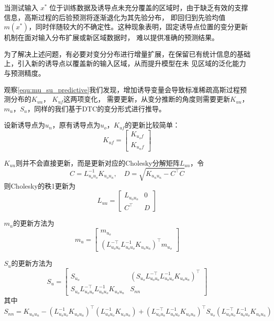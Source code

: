 当测试输入 $x^*$ 位于训练数据及诱导点未充分覆盖的区域时，由于缺乏有效的支撑信息，高斯过程的后验预测将逐渐退化为其先验分布，
即回归到先验均值 $m(x^*)$，同时伴随较大的不确定性。这种现象表明，固定诱导点位置的变分更新机制在面对输入分布扩展或新区域数据时，
难以提供准确的预测结果。

为了解决上述问题，有必要对变分分布进行增量扩展，在保留已有统计信息的基础上，引入新的诱导点以覆盖新的输入区域，从而提升模型在未
见区域的泛化能力与预测精度。

观察\autoref{equ:mu_su_predictive}我们发现，增加诱导变量会导致标准稀疏高斯过程预测分布的$K_{u u}$， $K_{u f}$这两项变化，
需要更新，从变分推断的角度则需要更新$K_{u u}$，$m_u$，$S_u$，同样的我们基于DTC的变分形式进行推导。

设新诱导点为$u_{n}$，原有诱导点为$u_{o}$，$K_{u f}$的更新比较简单：
\begin{equation}
    K_{u f} = \begin{bmatrix}
        K_{u_o f} \\
        K_{u_n f}
    \end{bmatrix}
\end{equation}

$K_{u u}$则并不会直接更新，而是更新对应的Cholesky分解矩阵$L_{u u}$，令
\begin{equation}
    C = L_{u_o u_o}^{-1} K_{u_o u_n}, \quad D = \sqrt{K_{u_n u_n} - C^\top C}
\end{equation}
则Cholesky的秩1更新为
\begin{equation}
    L_{u u} = \begin{bmatrix}
        L_{u_o u_o} & 0 \\
        C^\top & D
    \end{bmatrix}
\end{equation}

$m_u$的更新方法为
\begin{equation}
    m_u = \begin{bmatrix}
        m_{u_o} \\
        (L_{u_o u_o}^{-\top} L_{u_o u_o}^{-1} K_{u_o u_n})^\top m_{u_o}
    \end{bmatrix}
\end{equation}

$S_u$的更新方法为
\begin{equation}
    S_u = \begin{bmatrix}
        S_{u_o} & (S_{u_o} L_{u_o u_o}^{-\top} L_{u_o u_o}^{-1} K_{u_o u_n})^\top \\
        S_{u_o} L_{u_o u_o}^{-\top} L_{u_o u_o}^{-1} K_{u_o u_n} & S_{n n}
    \end{bmatrix}
\end{equation}
其中
\begin{equation}
    S_{n n} = K_{u_n u_n} - (L_{u_o u_o}^{-1} K_{u_o u_n})^\top (L_{u_o u_o}^{-1} K_{u_o u_n}) + 
    (L_{u_o u_o}^{-\top} L_{u_o u_o}^{-1} K_{u_o u_n})^\top S_{u_o} (L_{u_o u_o}^{-\top} L_{u_o u_o}^{-1} K_{u_o u_n})
\end{equation}

